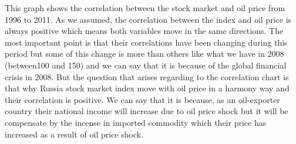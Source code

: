 \documentclass{article}
\begin{document}
This graph shows the correlation between the stock market and oil price from 1996 to 2011. As we assumed, the correlation between the index and oil price is always positive which means both variables move in the same directions. The most important point is that their correlations have been changing during this period but some of this change is more than others like what we have in 2008 (between100 and 150) and we can say that it is because of the global financial crisis in 2008. But the question that arises regarding to the correlation chart is that why Russia stock market index move with oil price in a harmony way and their correlation is positive. We can say that it is because, as an oil-exporter country their national income will increase due to oil price shock but it will be compensate by the incense in imported commodity  which their price has increased as a result of oil price shock.






\end{document}
